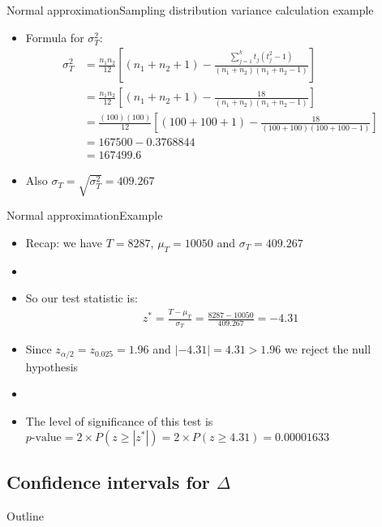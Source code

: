 \documentclass[xcolor=dvipsnames]{beamer}
\begin{document}
\begin{frame}{Normal approximation}{Sampling distribution variance calculation example}
\begin{itemize}
	\item Formula for $\sigma_T^{2}$: 	
	\begin{align*}
	\sigma_T^{2} &= \frac{n_1 n_2}{12}\left[(n_1 +n_2 +1)- \frac{\sum_{j=1}^k t_j (t_j^2-1)}{(n_1+n_2)(n_1+n_2-1)}\right] \\
	&= \frac{n_1 n_2}{12}\left[(n_1 +n_2 +1)- \frac{18}{(n_1+n_2)(n_1+n_2-1)}\right] \\
	&= \frac{(100)(100)}{12}\left[(100 + 100 +1)- \frac{18}{(100+100)(100+100-1)}\right] \\
	&= 167500 - 0.3768844 \\
	&= 167499.6
	\end{align*} \pause
	\item Also $\sigma_T = \sqrt{\sigma_T^2} = 409.267$
\end{itemize}
\end{frame}

\begin{frame}{Normal approximation}{Example}
	\begin{itemize}
		\item Recap: we have $T = 8287$, $\mu_T = 10050$ and $\sigma_T = 409.267$ \pause
		\item[]
		\item So our test statistic is:
		\begin{align*}
			z^* =\frac{T- \mu_T}{\sigma_T} = \frac{8287-10050}{409.267} = -4.31
		\end{align*} \pause
		\item Since $z_{\alpha/2} = z_{0.025} = 1.96$ and $|-4.31| = 4.31 > 1.96$ we reject the null hypothesis \pause
		\item[]
		\item The level of significance of this test is $p\text{-value}=2 \times P(z \geq |z^*|) = 2 \times P(z \geq 4.31) = 0.00001633$
	\end{itemize}
\end{frame}

\subsection{Confidence intervals for $\Delta$}
\begin{frame}{Outline}
\tableofcontents[currentsection,subsectionstyle=show/shaded/hide]
\end{frame}
\end{document}
